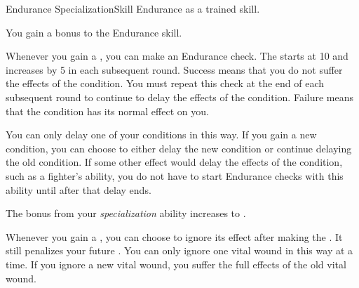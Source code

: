   \begin{feat}{Endurance Specialization}{Skill}
    \featpre Endurance as a trained skill.

     You gain a  bonus to the Endurance skill.

     Whenever you gain a , you can make an Endurance check.
    The  starts at 10 and increases by 5 in each subsequent round.
    Success means that you do not suffer the effects of the condition.
    You must repeat this check at the end of each subsequent round to continue to delay the effects of the condition.
    Failure means that the condition has its normal effect on you.

    You can only delay one of your conditions in this way.
    If you gain a new condition, you can choose to either delay the new condition or continue delaying the old condition.
    If some other effect would delay the effects of the condition, such as a fighter's  ability, you do not have to start Endurance checks with this ability until after that delay ends.

     The bonus from your \textit{specialization} ability increases to .

     Whenever you gain a , you can choose to ignore its effect after making the .
    It still penalizes your future .
    You can only ignore one vital wound in this way at a time.
    If you ignore a new vital wound, you suffer the full effects of the old vital wound.
  \end{feat}

